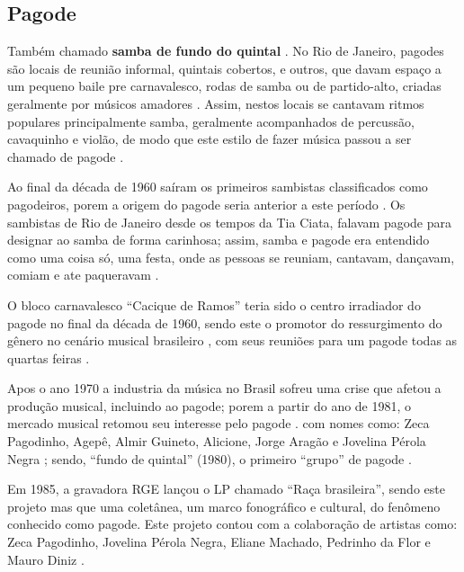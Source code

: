 \subsection{Pagode}
Também chamado \textbf{samba de fundo do quintal}  \cite[pp. 130]{perna2002samba}.
No Rio de Janeiro, pagodes são locais de reunião informal, quintais cobertos, e outros,
que davam espaço a um pequeno baile pre carnavalesco, 
rodas de samba ou de partido-alto, criadas geralmente por músicos amadores \cite[pp. 130]{perna2002samba} \cite[pp. 241]{dourado2004dicionario} \cite[pp. 241]{dourado2004dicionario}.
Assim, nestos locais se cantavam ritmos populares principalmente samba,
geralmente acompanhados de percussão, cavaquinho e violão, 
de modo que este  estilo de fazer música passou a ser chamado de pagode \cite[pp. 63]{reinato2010musica}  \cite[pp. 130]{perna2002samba}.

Ao final da década de 1960 saíram os primeiros sambistas classificados como pagodeiros,
porem a origem do pagode seria anterior a este período \cite{sedano2018bezerra}.
Os sambistas de Rio de Janeiro desde os tempos da Tia Ciata, 
falavam pagode para designar ao samba de forma carinhosa; 
assim, samba e pagode era entendido como uma coisa só, uma festa, 
onde as pessoas se reuniam, cantavam, dançavam, comiam e ate paqueravam \cite[pp. 209]{diniz2006almanaque}.

O bloco carnavalesco ``Cacique de Ramos'' teria sido o centro irradiador do pagode no final da década de 1960,
sendo este o promotor do ressurgimento do gênero no cenário musical brasileiro \cite{sedano2018bezerra},
com seus reuniões  para um pagode todas as quartas feiras  \cite[pp. 210]{diniz2006almanaque}.

Apos o ano 1970 a industria da música no Brasil sofreu uma crise que afetou a produção musical, 
incluindo ao pagode;
porem a partir do ano de 1981, o mercado musical retomou seu interesse pelo pagode \cite{sedano2018bezerra}.
com nomes como: Zeca Pagodinho, Agepê, Almir Guineto, Alicione, 
Jorge Aragão e Jovelina Pérola Negra \cite[pp. 130]{perna2002samba} \cite{sedano2018bezerra};
sendo, ``fundo de quintal'' (1980), o primeiro ``grupo'' de pagode \cite[pp. 130]{perna2002samba} \cite{fundodequintal}.

Em 1985, a gravadora RGE lançou o LP chamado  ``Raça brasileira'', 
sendo este projeto mas que uma coletânea, um marco fonográfico e cultural,
do fenômeno conhecido como pagode. Este projeto contou com a colaboração de artistas como:
Zeca Pagodinho, 
Jovelina Pérola Negra, 
Eliane Machado,
Pedrinho da Flor e
Mauro Diniz \cite[pp. 211]{diniz2006almanaque}.

